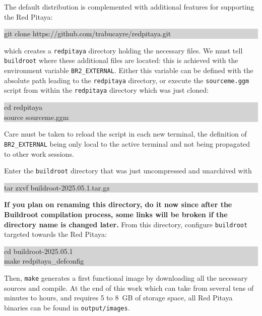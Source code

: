 \documentclass{article}
\begin{document}
The default distribution is complemented with additional features for supporting the Red Pitaya:\\
\colorbox{lightgray}{\begin{minipage}{0.9\textwidth}
git clone https://github.com/trabucayre/redpitaya.git
\end{minipage}} 

\noindent
which creates a {\tt redpitaya} directory holding the necessary files. We must tell 
{\tt buildroot} where these additional files are located: this is achieved with the
environment variable {\tt BR2\_EXTERNAL}. Either this variable can be defined with the
absolute path leading to the {\tt redpitaya} directory, or execute the {\tt sourceme.ggm} script
from within the {\tt redpitaya} directory which was just cloned:\\
\colorbox{lightgray}{\begin{minipage}{0.9\textwidth}
cd redpitaya \\
source sourceme.ggm
\end{minipage}} 

Care must be taken to reload the script in each new terminal, the definition of {\tt BR2\_EXTERNAL} 
being only local to the active terminal and not being propagated to other work sessions.

Enter the {\tt buildroot} directory that was just uncompressed and unarchived with\\
\colorbox{lightgray}{\begin{minipage}{0.9\textwidth}
tar zxvf buildroot-2025.05.1.tar.gz
\end{minipage}} 

{\bf If you plan on renaming this directory, do it now since after the Buildroot compilation
process, some links will be broken if the directory name is changed later.}
From this directory, configure {\tt buildroot} targeted towards the Red Pitaya:\\
\colorbox{lightgray}{\begin{minipage}{0.9\textwidth}
cd buildroot-2025.05.1 \\
make redpitaya\_defconfig 
\end{minipage}} 

Then, {\tt make} generates a first functional image by downloading all the necessary sources
and compile. At the end of this work which can take from several tens of minutes to hours, and
requires 5 to 8~GB of storage space, all Red Pitaya binaries can be found in {\tt output/images}.
\end{document}
